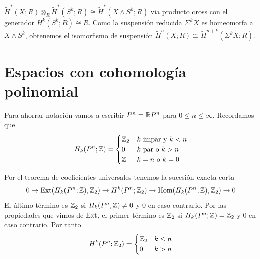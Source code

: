 \documentclass[TA.tex]{subfiles}
\begin{document}
\begin{ej}
$\widetilde{H}^*(X;R)\otimes_R\widetilde{H}^*(S^k;R)\cong \widetilde{H}^*(X\wedge S^k;R)$ via producto cross con el generador $H^k(S^k;R)\cong R$. Como la suspensión reducida $\Sigma^kX$ es homeomorfa a $X\wedge S^k$, obtenemos el isomorfismo de suspensión $\widetilde{H}^n(X;R)\cong \widetilde{H}^{n+k}(\Sigma^k X;R)$. 
\end{ej}

\section{Espacios con cohomología polinomial}
Para ahorrar notación vamos a escribir $P^n=\mathbb{R} P^n$ para $0\leq n\leq \infty$. Recordamos que $$H_k(P^n;\mathbb{Z})=\begin{cases}
\mathbb{Z}_2 & k\text{ impar y } k<n\\
0 & k\text{ par o } k>n\\
\mathbb{Z} & k=n\text{ o } k=0
\end{cases}$$

Por el teorema de coeficientes universales tenemos la sucesión exacta corta
\[
0\to \operatorname{Ext}(H_k(P^n;\mathbb{Z}),\mathbb{Z}_2)\to H^k(P^n;\mathbb{Z}_2)\to\operatorname{Hom}(H_k(P^n,\mathbb{Z}),\mathbb{Z}_2)\to 0
\]
El último término es $\mathbb{Z}_2$ si $H_k(P^n,\mathbb{Z})\neq 0$ y 0 en caso contrario. Por las propiedades que vimos de $\operatorname{Ext}$, el primer término es $\mathbb{Z}_2$ si $H_k(P^n;\mathbb{Z})=\mathbb{Z}_2$ y 0 en caso contrario. Por tanto
\[
H^k(P^n;\mathbb{Z}_2)=\begin{cases}
\mathbb{Z}_2 & k\leq n\\
0 & k>n
\end{cases}
\]
\end{document}

